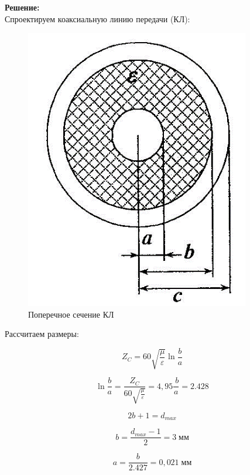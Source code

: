 \documentclass[fontsize=14pt,a4paper]{scrartcl}
\begin{document}
    {\bfseries Решение:}\\ 
    \indent Спроектируем коаксиальную линию передачи (КЛ):

    \begin{figure}[h!]
      \centering
      \includegraphics[scale=1]{data/lab_5/fig/1.png}
      \caption{Поперечное сечение КЛ}
      \label{fig:ris1}
    \end{figure}

    \indent Рассчитаем размеры:

    \begin{equation}
      Z_C=60\sqrt{\frac{\mu}{\varepsilon}}\ln{\frac{b}{a}}
    \end{equation}

    \begin{equation}
      \ln{\frac{b}{a}}=\frac{Z_C}{60\sqrt{\frac{\mu}{\varepsilon}}}=4,95    \frac{\ b}{a}=2.428
    \end{equation}

    \begin{equation}
      2b+1=d_{max}
    \end{equation}

    \begin{equation}
      b=\frac{d_{max}-1}{2}=3\; \text{мм}
    \end{equation}

    \begin{equation}
      a=\frac{b}{2.427}=0,021\; \text{мм}
    \end{equation}
\end{document}
